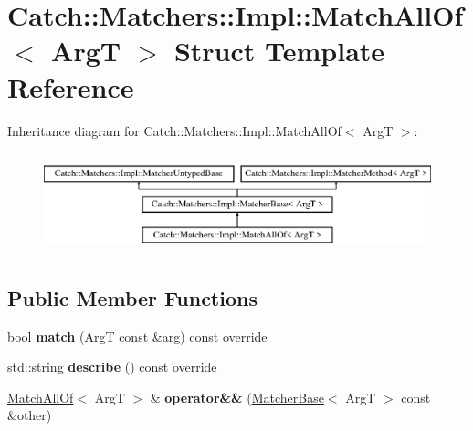 \hypertarget{struct_catch_1_1_matchers_1_1_impl_1_1_match_all_of}{}\section{Catch\+:\+:Matchers\+:\+:Impl\+:\+:Match\+All\+Of$<$ ArgT $>$ Struct Template Reference}
\label{struct_catch_1_1_matchers_1_1_impl_1_1_match_all_of}
Inheritance diagram for Catch\+:\+:Matchers\+:\+:Impl\+:\+:Match\+All\+Of$<$ ArgT $>$\+:\begin{figure}[H]
\begin{center}
\leavevmode
\includegraphics[height=2.926829cm]{struct_catch_1_1_matchers_1_1_impl_1_1_match_all_of}
\end{center}
\end{figure}
\subsection*{Public Member Functions}
\begin{DoxyCompactItemize}
\item 
\mbox{\label{struct_catch_1_1_matchers_1_1_impl_1_1_match_all_of_acfb377bda2c58ae62e6df9c3a8a89f8f}} 
bool {\bfseries match} (ArgT const \&arg) const override
\item 
\mbox{\label{struct_catch_1_1_matchers_1_1_impl_1_1_match_all_of_acbb9a083e93b546fd33c9235b644c40f}} 
std\+::string {\bfseries describe} () const override
\item 
\mbox{\label{struct_catch_1_1_matchers_1_1_impl_1_1_match_all_of_a9d0e38b36474336498d627610db434f3}} 
\mbox{\hyperlink{struct_catch_1_1_matchers_1_1_impl_1_1_match_all_of}{Match\+All\+Of}}$<$ ArgT $>$ \& {\bfseries operator\&\&} (\mbox{\hyperlink{struct_catch_1_1_matchers_1_1_impl_1_1_matcher_base}{Matcher\+Base}}$<$ ArgT $>$ const \&other)
\end{DoxyCompactItemize}
